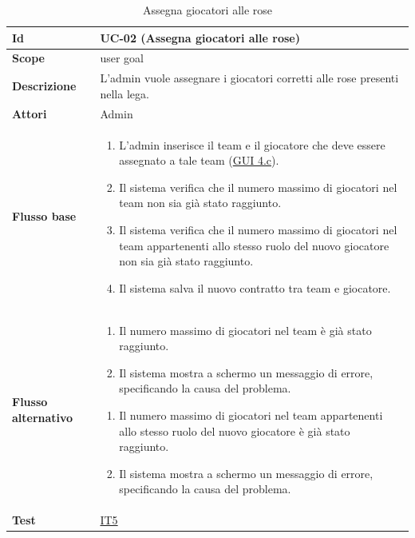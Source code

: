 \begin{table}[H]
\caption{Assegna giocatori alle rose}
\label{UC-02}

\begin{tabularx}{\textwidth}{|l|X|}
\hline
\textbf{Id} & UC-02 (Assegna giocatori alle rose) \\
\hline
\textbf{Scope} & user goal \\
\hline
\textbf{Descrizione} & L'admin vuole assegnare i giocatori corretti alle rose presenti nella lega. \\
\hline
\textbf{Attori} & Admin \\
\hline
\textbf{Flusso base} &
\begin{enumerate}[leftmargin=*]
    \item L'admin inserisce il team e il giocatore che deve essere assegnato a tale team (\hyperref[fig:mockup_parte4]{GUI 4.c}).
    \item Il sistema verifica che il numero massimo di giocatori nel team non sia già stato raggiunto.
    \item Il sistema verifica che il numero massimo di giocatori nel team appartenenti allo 
            stesso ruolo del nuovo giocatore non sia già stato raggiunto.
    \item Il sistema salva il nuovo contratto tra team e giocatore.
\end{enumerate} \\
\hline
\textbf{Flusso alternativo} &
\begin{enumerate}[leftmargin=*,label=2.\arabic*]
    \item Il numero massimo di giocatori nel team è già stato raggiunto.
    \item Il sistema mostra a schermo un messaggio di errore, specificando la causa del problema.
\end{enumerate}
\begin{enumerate}[leftmargin=*,label=3.\arabic*]
    \item Il numero massimo di giocatori nel team appartenenti allo stesso ruolo
            del nuovo giocatore è già stato raggiunto.
    \item Il sistema mostra a schermo un messaggio di errore, specificando la causa del problema.
\end{enumerate} \\
\hline
\textbf{Test} & \hyperref[IT5]{IT5} \\
\hline
\end{tabularx}

\end{table}



